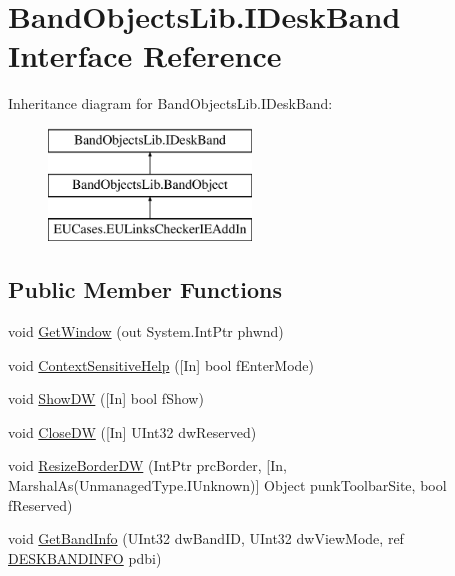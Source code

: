 \hypertarget{interface_band_objects_lib_1_1_i_desk_band}{\section{Band\+Objects\+Lib.\+I\+Desk\+Band Interface Reference}
\label{interface_band_objects_lib_1_1_i_desk_band}
}
Inheritance diagram for Band\+Objects\+Lib.\+I\+Desk\+Band\+:\begin{figure}[H]
\begin{center}
\leavevmode
\includegraphics[height=3.000000cm]{interface_band_objects_lib_1_1_i_desk_band}
\end{center}
\end{figure}
\subsection*{Public Member Functions}
\begin{DoxyCompactItemize}
\item 
void \hyperlink{interface_band_objects_lib_1_1_i_desk_band_afb33643eab3f53b230d6e70719962eeb}{Get\+Window} (out System.\+Int\+Ptr phwnd)
\item 
void \hyperlink{interface_band_objects_lib_1_1_i_desk_band_ac249e5f4d33db4a927ebb2669ffd7d83}{Context\+Sensitive\+Help} (\mbox{[}In\mbox{]} bool f\+Enter\+Mode)
\item 
void \hyperlink{interface_band_objects_lib_1_1_i_desk_band_ac02ef9977e10ec6940ab08cf99f00d55}{Show\+D\+W} (\mbox{[}In\mbox{]} bool f\+Show)
\item 
void \hyperlink{interface_band_objects_lib_1_1_i_desk_band_a3130f88c90d15dc22ccdce016dc3b224}{Close\+D\+W} (\mbox{[}In\mbox{]} U\+Int32 dw\+Reserved)
\item 
void \hyperlink{interface_band_objects_lib_1_1_i_desk_band_ab9457777003ca591b47fb4ab5fcb3a88}{Resize\+Border\+D\+W} (Int\+Ptr prc\+Border, \mbox{[}In, Marshal\+As(Unmanaged\+Type.\+I\+Unknown)\mbox{]} Object punk\+Toolbar\+Site, bool f\+Reserved)
\item 
void \hyperlink{interface_band_objects_lib_1_1_i_desk_band_adbf3a92266e0f35a1b0c3195c3ab0518}{Get\+Band\+Info} (U\+Int32 dw\+Band\+I\+D, U\+Int32 dw\+View\+Mode, ref \hyperlink{struct_band_objects_lib_1_1_d_e_s_k_b_a_n_d_i_n_f_o}{D\+E\+S\+K\+B\+A\+N\+D\+I\+N\+F\+O} pdbi)
\end{DoxyCompactItemize}


